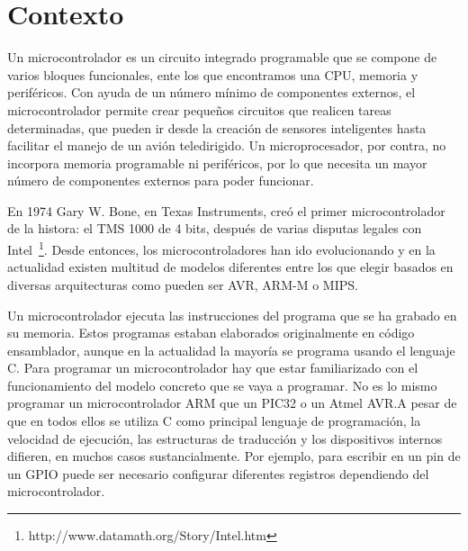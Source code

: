 

\section{Contexto} %
%
\label{sec:Contexto}
Un microcontrolador es un circuito integrado programable que se compone de varios bloques funcionales, ente los que encontramos una CPU, memoria y periféricos. Con ayuda de un número mínimo de componentes externos, el microcontrolador permite crear pequeños circuitos que realicen tareas determinadas, que pueden ir desde la creación de sensores inteligentes hasta facilitar el manejo de un avión teledirigido. Un microprocesador, por contra, no incorpora memoria programable ni periféricos, por lo que necesita un mayor número de componentes externos para poder funcionar.


En 1974 Gary W. Bone, en Texas Instruments, creó el primer microcontrolador de la histora: el TMS 1000 de 4 bits, después de varias disputas legales con Intel~\footnote{http://www.datamath.org/Story/Intel.htm}. Desde entonces, los microcontroladores han ido evolucionando y en la actualidad existen multitud de modelos diferentes entre los que elegir basados en diversas arquitecturas como pueden ser AVR, ARM-M o MIPS.\@

Un microcontrolador ejecuta las instrucciones del programa que se ha grabado en su memoria. Estos programas estaban elaborados originalmente en código ensamblador, aunque en la actualidad la mayoría se programa usando el lenguaje C. Para programar un microcontrolador hay que estar familiarizado con el funcionamiento del modelo concreto que se vaya a programar. No es lo mismo programar un microcontrolador ARM que un PIC32 o un Atmel AVR.\@ A pesar de que en todos ellos se utiliza C como principal lenguaje de programación, la velocidad de ejecución, las estructuras de traducción y los dispositivos internos difieren, en muchos casos sustancialmente. Por ejemplo, para escribir en un pin de un GPIO puede ser necesario configurar diferentes registros dependiendo del microcontrolador.

